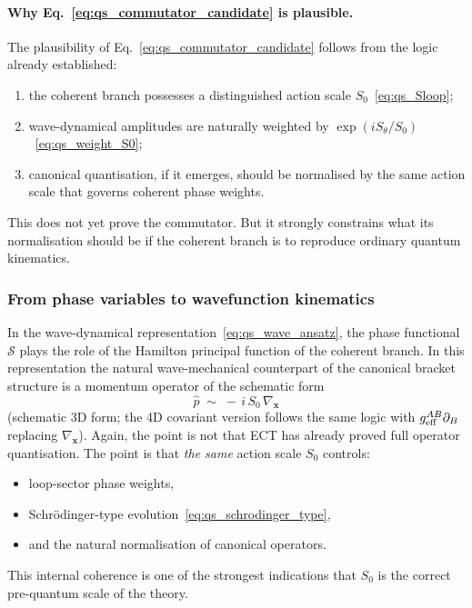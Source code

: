 \documentclass[11pt,a4paper]{article}
\numberwithin{equation}{section}
\begin{document}
\paragraph{Why Eq.~\eqref{eq:qs_commutator_candidate} is plausible.}
The plausibility of Eq.~\eqref{eq:qs_commutator_candidate} follows from
the logic already established:
\begin{enumerate}[label=(\roman*)]
  \item the coherent branch possesses a distinguished action scale
    $S_0$~\eqref{eq:qs_Sloop};
  \item wave-dynamical amplitudes are naturally weighted by
    $\exp(iS_\theta/S_0)$~\eqref{eq:qs_weight_S0};
  \item canonical quantisation, if it emerges, should be normalised by
    the same action scale that governs coherent phase weights.
\end{enumerate}
This does not yet prove the commutator.
But it strongly constrains what its normalisation should be if the
coherent branch is to reproduce ordinary quantum kinematics.

\subsubsection*{From phase variables to wavefunction kinematics}

In the wave-dynamical representation~\eqref{eq:qs_wave_ansatz}, the
phase functional $\mathcal{S}$ plays the role of the Hamilton
principal function of the coherent branch.
In this representation the natural wave-mechanical counterpart of the
canonical bracket structure is a momentum operator of the schematic form
\begin{equation}
  \label{eq:qs_p_operator}
  \hat p
  \;\sim\;
  -\,i\,S_0\,\nabla_{\mathbf{x}}
\end{equation}
(schematic 3D form; the 4D covariant version follows the same logic
with $g_{\rm eff}^{AB}\partial_B$ replacing $\nabla_{\mathbf{x}}$).
Again, the point is not that ECT has already proved full operator
quantisation.
The point is that \emph{the same} action scale $S_0$ controls:
\begin{itemize}
  \item loop-sector phase weights,
  \item Schr\"odinger-type evolution~\eqref{eq:qs_schrodinger_type},
  \item and the natural normalisation of canonical operators.
\end{itemize}
This internal coherence is one of the strongest indications that $S_0$
is the correct pre-quantum scale of the theory.
\end{document}
